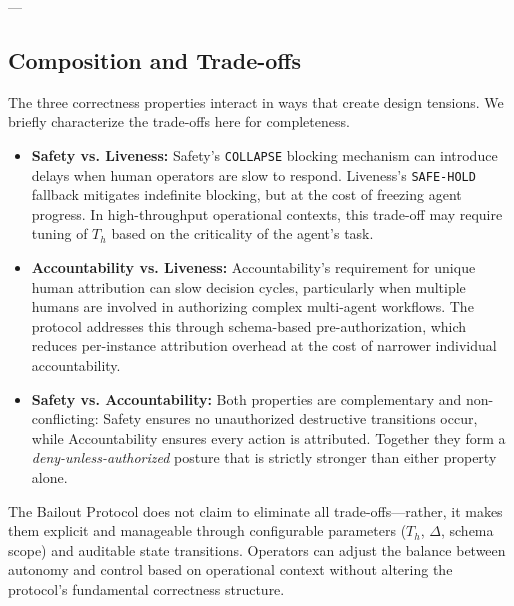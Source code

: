 ---

\subsection{Composition and Trade-offs}

The three correctness properties interact in ways that create design tensions. We briefly characterize the trade-offs here for completeness.

\begin{itemize}
    \item \textbf{Safety vs. Liveness:} Safety's \texttt{COLLAPSE} blocking mechanism can introduce delays when human operators are slow to respond. Liveness's \texttt{SAFE-HOLD} fallback mitigates indefinite blocking, but at the cost of freezing agent progress. In high-throughput operational contexts, this trade-off may require tuning of $T_h$ based on the criticality of the agent's task.
    \item \textbf{Accountability vs. Liveness:} Accountability's requirement for unique human attribution can slow decision cycles, particularly when multiple humans are involved in authorizing complex multi-agent workflows. The protocol addresses this through schema-based pre-authorization, which reduces per-instance attribution overhead at the cost of narrower individual accountability.
    \item \textbf{Safety vs. Accountability:} Both properties are complementary and non-conflicting: Safety ensures no unauthorized destructive transitions occur, while Accountability ensures every action is attributed. Together they form a \emph{deny-unless-authorized} posture that is strictly stronger than either property alone.
\end{itemize}

The Bailout Protocol does not claim to eliminate all trade-offs—rather, it makes them explicit and manageable through configurable parameters ($T_h$, $\Delta$, schema scope) and auditable state transitions. Operators can adjust the balance between autonomy and control based on operational context without altering the protocol's fundamental correctness structure.

